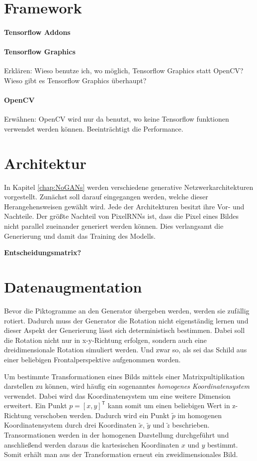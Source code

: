 \section{Framework}
\paragraph{Tensorflow Addons}
\paragraph{Tensorflow Graphics}
Erklären: Wieso benutze ich, wo möglich, Tensorflow Graphics statt OpenCV? Wieso gibt es Tensorflow Graphics überhaupt?
\paragraph{OpenCV}
Erwähnen: OpenCV wird nur da benutzt, wo keine Tensorflow funktionen verwendet werden können. Beeinträchtigt die Performance.

\section{Architektur}
In Kapitel \ref{chap:NoGANs} werden verschiedene generative Netzwerkarchitekturen vorgestellt. Zunächst soll darauf eingegangen werden, welche dieser Herangehensweisen gewählt wird. Jede der Architekturen besitzt ihre Vor- und Nachteile. Der größte Nachteil von \acp{PixelRNN} ist, dass die Pixel eines Bildes nicht parallel zueinander generiert werden können. Dies verlangsamt die Generierung und damit das Training des Modells.

\textbf{Entscheidungsmatrix?}

\section{Datenaugmentation}
Bevor die Piktogramme an den Generator übergeben werden, werden sie zufällig rotiert. Dadurch muss der Generator die Rotation nicht eigenständig lernen und dieser Aspekt der Generierung lässt sich deterministisch bestimmen. Dabei soll die Rotation nicht nur in x-y-Richtung erfolgen, sondern auch eine dreidimensionale Rotation simuliert werden. Und zwar so, als sei das Schild aus einer beliebigen Frontalperspektive aufgenommen worden.

Um bestimmte Transformationen eines Bilds mittels einer Matrixpultiplikation darstellen zu können, wird häufig ein sogenanntes \emph{homogenes Koordinatensystem} verwendet. Dabei wird das Koordinatensystem um eine weitere Dimension erweitert. Ein Punkt $p = [x, y]^\mathsf{T}$ kann somit um einen beliebigen Wert in z-Richtung verschoben werden. Dadurch wird ein Punkt $\tilde{p}$ im homogenen Koordinatensystem durch drei Koordinaten $\tilde{x}$, $\tilde{y}$ und $\tilde{z}$ beschrieben. Transormationen werden in der homogenen Darstellung durchgeführt und anschließend werden daraus die kartesischen Koordinaten $x$ und $y$ bestimmt. Somit erhält man aus der Transformation erneut ein zweidimensionales Bild. \cite{geometric-ops} \cite{math-primer}

